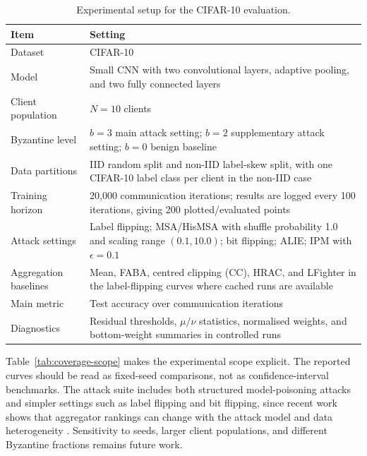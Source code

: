 \begin{table}[t]
    \centering
    \caption{Experimental setup for the CIFAR-10 evaluation.}
    \label{tab:exp-setup}
    \begin{tabular}{p{}p{}}
        \hline
        \textbf{Item} & \textbf{Setting} \\
        \hline
        Dataset & CIFAR-10 \\
        Model & Small CNN with two convolutional layers, adaptive pooling, and two fully connected layers \\
        Client population & $N=10$ clients \\
        Byzantine level & $b=3$ main attack setting; $b=2$ supplementary attack setting; $b=0$ benign baseline \\
        Data partitions & IID random split and non-IID label-skew split, with one CIFAR-10 label class per client in the non-IID case \\
        Training horizon & 20,000 communication iterations; results are logged every 100 iterations, giving 200 plotted/evaluated points \\
        Attack settings & Label flipping; MSA/HisMSA with shuffle probability 1.0 and scaling range $(0.1,10.0)$; bit flipping; ALIE; IPM with $\epsilon=0.1$ \\
        Aggregation baselines & Mean, FABA, centred clipping (CC), HRAC, and LFighter in the label-flipping curves where cached runs are available \\
        Main metric & Test accuracy over communication iterations \\
        Diagnostics & Residual thresholds, $\mu/\nu$ statistics, normalised weights, and bottom-weight summaries in controlled runs \\
        \hline
    \end{tabular}
\end{table}

Table~\ref{tab:coverage-scope} makes the experimental scope explicit. The
reported curves should be read as fixed-seed comparisons, not as
confidence-interval benchmarks. The attack suite includes both structured
model-poisoning attacks and simpler settings such as label flipping and bit
flipping, since recent work shows that aggregator rankings can change with the
attack model and data heterogeneity \cite{JMLR:v26:24-1307}. Sensitivity to
seeds, larger client populations, and different Byzantine fractions remains
future work.

